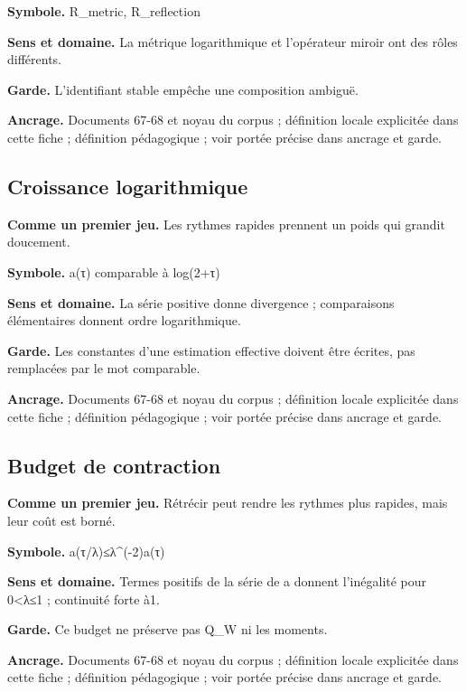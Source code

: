 \documentclass[
  9pt,
  a4paper,
]{article}
\begin{document}
\textbf{Symbole.} R\_metric, R\_reflection

\textbf{Sens et domaine.} La métrique logarithmique et l'opérateur
miroir ont des rôles différents.

\textbf{Garde.} L'identifiant stable empêche une composition ambiguë.

\textbf{Ancrage.} Documents 67-68 et noyau du corpus ; définition locale
explicitée dans cette fiche ; définition pédagogique ; voir portée
précise dans ancrage et garde.

\hypertarget{croissance-logarithmique}{%
\subsection{Croissance logarithmique}\label{croissance-logarithmique}}

\textbf{Comme un premier jeu.} Les rythmes rapides prennent un poids qui
grandit doucement.

\textbf{Symbole.} a(τ) comparable à log(2+\textbar τ\textbar)

\textbf{Sens et domaine.} La série positive donne divergence ;
comparaisons élémentaires donnent ordre logarithmique.

\textbf{Garde.} Les constantes d'une estimation effective doivent être
écrites, pas remplacées par le mot comparable.

\textbf{Ancrage.} Documents 67-68 et noyau du corpus ; définition locale
explicitée dans cette fiche ; définition pédagogique ; voir portée
précise dans ancrage et garde.

\hypertarget{budget-de-contraction}{%
\subsection{Budget de contraction}\label{budget-de-contraction}}

\textbf{Comme un premier jeu.} Rétrécir peut rendre les rythmes plus
rapides, mais leur coût est borné.

\textbf{Symbole.} a(τ/λ)≤λ\^{}(-2)a(τ)

\textbf{Sens et domaine.} Termes positifs de la série de a donnent
l'inégalité pour 0\textless λ≤1 ; continuité forte à1.

\textbf{Garde.} Ce budget ne préserve pas Q\_W ni les moments.

\textbf{Ancrage.} Documents 67-68 et noyau du corpus ; définition locale
explicitée dans cette fiche ; définition pédagogique ; voir portée
précise dans ancrage et garde.
\end{document}
